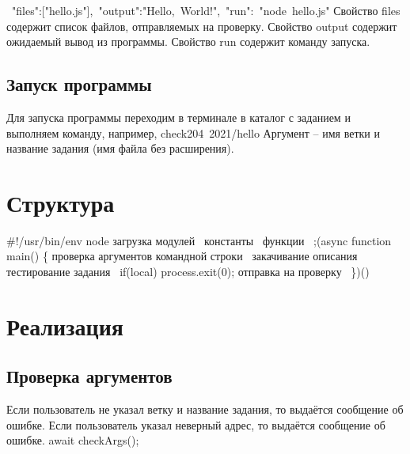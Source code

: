 {\Tt{}{\nwlbrace}\ "files":["hello.js"],\ "output":"Hello,\ World!",\ "run":\ "node\ hello.js"{\nwrbrace}\nwendquote}
Свойство files содержит список файлов, отправляемых на проверку.
Свойство output содержит ожидаемый вывод из программы.
Свойство run содержит команду запуска.

\subsection{Запуск программы}
Для запуска программы переходим в терминале в каталог
с заданием и выполняем команду, например,
{\Tt{}check204\ 2021/hello\nwendquote}
Аргумент -- имя ветки и название задания (имя файла без расширения).


\section{Структура}
\nwenddocs{}\endmoddef\nwstartdeflinemarkup\nwenddeflinemarkup
#!/usr/bin/env node
\LA{}загрузка модулей~{\nwtagstyle{}}\RA{}
\LA{}константы~{\nwtagstyle{}}\RA{}
\LA{}функции~{\nwtagstyle{}}\RA{}
;(async function main()
\{
        \LA{}проверка аргументов командной строки~{\nwtagstyle{}}\RA{}
        \LA{}закачивание описания~{\nwtagstyle{}}\RA{}
        \LA{}тестирование задания~{\nwtagstyle{}}\RA{}
        if(local)
                process.exit(0);
        \LA{}отправка на проверку~{\nwtagstyle{}}\RA{}
\})()
\nwendcode{}\nwdocspar

\section{Реализация}
\subsection{Проверка аргументов}
Если пользователь не указал ветку и название задания, 
то выдаётся сообщение об ошибке.
Если пользователь указал неверный адрес, то выдаётся сообщение об ошибке.
\nwenddocs{}\endmoddef\nwstartdeflinemarkup{}\nwenddeflinemarkup
await checkArgs();
\nwendcode{}\nwdocspar

